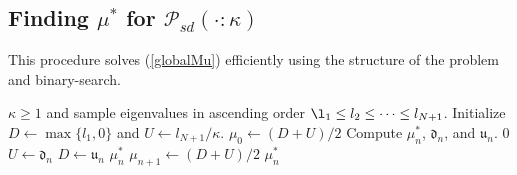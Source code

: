 \documentclass[11pt]{article}
\newcommand{\bLambda}{\boldsymbol{\lambda}}
\theoremstyle{definition}
\theoremstyle{definition}
\def\bSigma{{\bf \Sigma}}
\def\bLambda{{\bf \Lambda}}
\begin{document}
\subsection{Finding $\mu^*$ for $\mathcal{P}_{sd}(\cdot : \kappa)$} 
 \begin{algorithm}[t!]
\caption{This procedure solves (\ref{globalMu}) efficiently using the structure of the problem and binary-search.} 
\label{projSD_algo}
\begin{algorithmic}[1]
\Require $\kappa \geq 1$ and sample eigenvalues in ascending order $\l_1 \leq l_2 \leq \dots \leq l_{N+1}$.
\State Initialize $D \leftarrow \max\{l_1,0\}$ and  $U \leftarrow l_{N+1}/\kappa$.
\State $\mu_0 \leftarrow (D + U)/2$
\State Compute $\mu_n^*$, $\mathfrak{d}_n$, and $\mathfrak{u}_n$. 
\State \Return $0$ 
\State $U \leftarrow \mathfrak{d}_n$
\State $D \leftarrow \mathfrak{u}_n$
\Else 
\State \Return $\mu_n^*$
\EndIf
\State $\mu_{n+1} \leftarrow (D + U)/2$
\EndFor
\State \Return $\mu_n^*$
\EndProcedure
\end{algorithmic}
\label{algo}
\end{algorithm}
\end{document}
